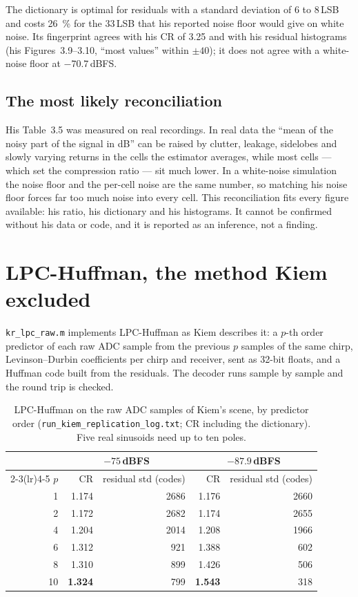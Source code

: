 \noindent
The dictionary is optimal for residuals with a standard deviation of 6 to
8\,LSB and costs \SI{26}{\percent} for the 33\,LSB that his reported noise floor
would give on white noise. Its fingerprint agrees with his CR of 3.25 and with
his residual histograms (his Figures~3.9--3.10, ``most values'' within
$\pm 40$); it does not agree with a white-noise floor at $-70.7$\,dBFS.

\subsection{The most likely reconciliation}

His Table~3.5 was measured on real recordings. In real data the ``mean of the
noisy part of the signal in dB'' can be raised by clutter, leakage, sidelobes
and slowly varying returns in the cells the estimator averages, while most cells
--- which set the compression ratio --- sit much lower. In a white-noise
simulation the noise floor and the per-cell noise are the same number, so
matching his noise floor forces far too much noise into every cell. This
reconciliation fits every figure available: his ratio, his dictionary and his
histograms. It cannot be confirmed without his data or code, and it is reported
as an inference, not a finding.

\section{LPC-Huffman, the method Kiem excluded}
\label{sec:kr_lpcraw}

\texttt{kr\_lpc\_raw.m} implements LPC-Huffman as Kiem describes it: a $p$-th
order predictor of each raw ADC sample from the previous $p$ samples of the same
chirp, Levinson--Durbin coefficients per chirp and receiver, sent as 32-bit
floats, and a Huffman code built from the residuals. The decoder runs sample by
sample and the round trip is checked.

\begin{table}[htbp]
\centering
\caption[LPC-Huffman of Meucci and Mancuso by order]{LPC-Huffman on the raw ADC samples of
Kiem's scene, by predictor order (\texttt{run\_kiem\_replication\_log.txt}; CR
including the dictionary). Five real sinusoids need up to ten poles.}
\label{tab:kr_lpcorder}
\small
\begin{tabular}{@{}rrrrr@{}}
\toprule
& \multicolumn{2}{c}{$-75$\,dBFS} & \multicolumn{2}{c}{$-87.9$\,dBFS}\\
\cmidrule(lr){2-3}\cmidrule(lr){4-5}
$p$ & CR & residual std (codes) & CR & residual std (codes)\\
\midrule
1  & 1.174 & 2686 & 1.176 & 2660\\
2  & 1.172 & 2682 & 1.174 & 2655\\
4  & 1.204 & 2014 & 1.208 & 1966\\
6  & 1.312 & 921  & 1.388 & 602\\
8  & 1.310 & 899  & 1.426 & 506\\
10 & \textbf{1.324} & 799 & \textbf{1.543} & 318\\
\bottomrule
\end{tabular}
\end{table}

